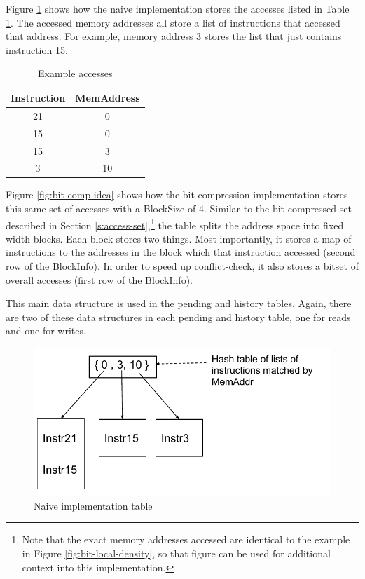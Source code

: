 \documentclass[12pt,twoside]{reedthesis}
\begin{document}
			Figure \ref{fig:naive-table} shows how the naive implementation stores the accesses listed in Table \ref{t:examp-acc}. The accessed memory addresses all store a list of instructions that accessed that address. For example, memory address 3 stores the list that just contains instruction 15. 
			
			\begin{table}[H]
				\caption{Example accesses}
				\label{t:examp-acc}
				\begin{tabular}{ |c|c| }
					\hline
					Instruction & MemAddress \\ \hline
					21 & 0 \\ \hline
					15 & 0 \\ \hline
					15 & 3 \\ \hline
					3 & 10 \\ \hline
				\end{tabular}
			\end{table}
			
			
			
			Figure \ref{fig:bit-comp-idea} shows how the bit compression implementation stores this same set of accesses with a BlockSize of 4. 
			Similar to  the bit compressed set described in Section \ref{s:access-set},\footnote{Note that the exact memory addresses accessed are identical to the example in Figure \ref{fig:bit-local-density}, so that figure can be used for additional context into this implementation.} the table splits the address space into fixed width blocks. Each block stores two things. Most importantly, it stores a map of instructions to the addresses in the block which that instruction accessed (second row of the BlockInfo). In order to speed up conflict-check, it also stores a bitset of overall accesses (first row of the BlockInfo). 
			
			This main data structure is used in the pending and history tables. Again, there are two of these data structures in each pending and history table, one for reads and one for writes. 
			
			\begin{figure}[h]
				\caption{Naive implementation table}
				\label{fig:naive-table}
				\includegraphics[scale=0.85]{BlockSetnaive_structure.pdf}
			\end{figure}
		
\end{document}
